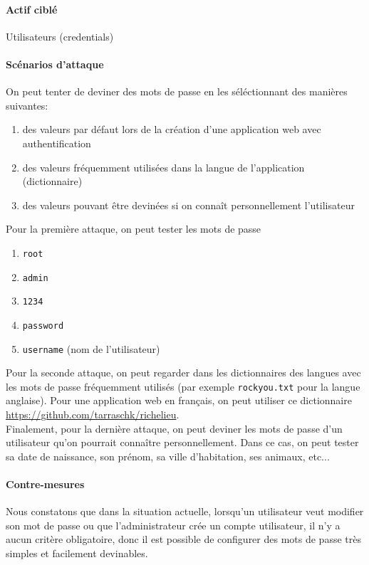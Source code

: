 \documentclass[a4paper,10pt]{article}
\begin{document}
        \paragraph{Actif ciblé} Utilisateurs (credentials)
        \paragraph{Scénarios d'attaque} On peut tenter de deviner des mots de passe en les séléctionnant des manières suivantes:
        \begin{onehalfspacing}
        \begin{enumerate}
        \item des valeurs par défaut lors de la création d'une application web avec authentification
        \item des valeurs fréquemment utilisées dans la langue de l'application (dictionnaire)
        \item des valeurs pouvant être devinées si on connaît personnellement l'utilisateur  \\
        \end{enumerate}
        \end{onehalfspacing}
        Pour la première attaque, on peut tester les mots de passe
        \begin{enumerate}
        \item[] \verb|root|
        \item[] \verb|admin|
        \item[] \verb|1234|
        \item[] \verb|password|
        \item[] \verb|username| (nom de l'utilisateur) \\
        \end{enumerate}
        Pour la seconde attaque, on peut regarder dans les dictionnaires des langues avec les mots de passe fréquemment utilisés (par exemple \verb|rockyou.txt| pour la langue anglaise). Pour une application web en français, on peut utiliser ce dictionnaire \url{https://github.com/tarraschk/richelieu}. \\
        
        Finalement, pour la dernière attaque, on peut deviner les mots de passe d'un utilisateur qu'on pourrait connaître personnellement. Dans ce cas, on peut tester sa date de naissance, son prénom, sa ville d'habitation, ses animaux, etc...
        \paragraph{Contre-mesures} Nous constatons que dans la situation actuelle, lorsqu'un utilisateur veut modifier son mot de passe ou que l'administrateur crée un compte utilisateur, il n'y a aucun critère obligatoire, donc il est possible de configurer des mots de passe très simples et facilement devinables. \\
        
\end{document}
